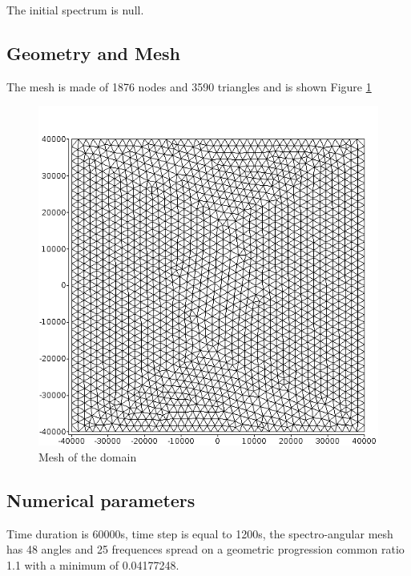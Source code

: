 The initial spectrum is null.
%

%
%
%
%
\subsection{Geometry and Mesh}
%
The mesh is made of 1876 nodes and 3590 triangles and is shown Figure \ref{mail}
\begin{figure} [!h]
\centering
\includegraphics[scale = 0.5]{maill.png}
 \caption{Mesh of the domain}
\label{mail}
\end{figure}

%
%

\subsection{Numerical parameters}
%
Time duration is 60000s, time step is equal to 1200s, the spectro-angular mesh
has 48 angles and 25 frequences spread on a geometric progression common ratio
1.1 with a minimum of  0.04177248.
%
%
